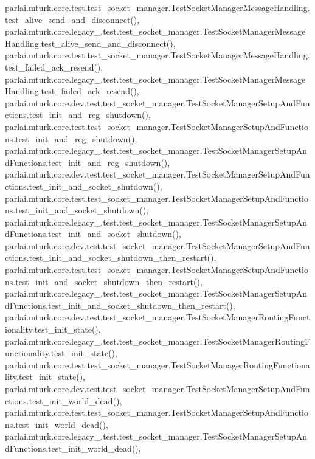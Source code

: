 parlai.\+mturk.\+core.\+test.\+test\+\_\+socket\+\_\+manager.\+Test\+Socket\+Manager\+Message\+Handling.\+test\+\_\+alive\+\_\+send\+\_\+and\+\_\+disconnect(), parlai.\+mturk.\+core.\+legacy\+\_.\+test.\+test\+\_\+socket\+\_\+manager.\+Test\+Socket\+Manager\+Message\+Handling.\+test\+\_\+alive\+\_\+send\+\_\+and\+\_\+disconnect(), parlai.\+mturk.\+core.\+test.\+test\+\_\+socket\+\_\+manager.\+Test\+Socket\+Manager\+Message\+Handling.\+test\+\_\+failed\+\_\+ack\+\_\+resend(), parlai.\+mturk.\+core.\+legacy\+\_.\+test.\+test\+\_\+socket\+\_\+manager.\+Test\+Socket\+Manager\+Message\+Handling.\+test\+\_\+failed\+\_\+ack\+\_\+resend(), parlai.\+mturk.\+core.\+dev.\+test.\+test\+\_\+socket\+\_\+manager.\+Test\+Socket\+Manager\+Setup\+And\+Functions.\+test\+\_\+init\+\_\+and\+\_\+reg\+\_\+shutdown(), parlai.\+mturk.\+core.\+test.\+test\+\_\+socket\+\_\+manager.\+Test\+Socket\+Manager\+Setup\+And\+Functions.\+test\+\_\+init\+\_\+and\+\_\+reg\+\_\+shutdown(), parlai.\+mturk.\+core.\+legacy\+\_.\+test.\+test\+\_\+socket\+\_\+manager.\+Test\+Socket\+Manager\+Setup\+And\+Functions.\+test\+\_\+init\+\_\+and\+\_\+reg\+\_\+shutdown(), parlai.\+mturk.\+core.\+dev.\+test.\+test\+\_\+socket\+\_\+manager.\+Test\+Socket\+Manager\+Setup\+And\+Functions.\+test\+\_\+init\+\_\+and\+\_\+socket\+\_\+shutdown(), parlai.\+mturk.\+core.\+test.\+test\+\_\+socket\+\_\+manager.\+Test\+Socket\+Manager\+Setup\+And\+Functions.\+test\+\_\+init\+\_\+and\+\_\+socket\+\_\+shutdown(), parlai.\+mturk.\+core.\+legacy\+\_.\+test.\+test\+\_\+socket\+\_\+manager.\+Test\+Socket\+Manager\+Setup\+And\+Functions.\+test\+\_\+init\+\_\+and\+\_\+socket\+\_\+shutdown(), parlai.\+mturk.\+core.\+dev.\+test.\+test\+\_\+socket\+\_\+manager.\+Test\+Socket\+Manager\+Setup\+And\+Functions.\+test\+\_\+init\+\_\+and\+\_\+socket\+\_\+shutdown\+\_\+then\+\_\+restart(), parlai.\+mturk.\+core.\+test.\+test\+\_\+socket\+\_\+manager.\+Test\+Socket\+Manager\+Setup\+And\+Functions.\+test\+\_\+init\+\_\+and\+\_\+socket\+\_\+shutdown\+\_\+then\+\_\+restart(), parlai.\+mturk.\+core.\+legacy\+\_.\+test.\+test\+\_\+socket\+\_\+manager.\+Test\+Socket\+Manager\+Setup\+And\+Functions.\+test\+\_\+init\+\_\+and\+\_\+socket\+\_\+shutdown\+\_\+then\+\_\+restart(), parlai.\+mturk.\+core.\+dev.\+test.\+test\+\_\+socket\+\_\+manager.\+Test\+Socket\+Manager\+Routing\+Functionality.\+test\+\_\+init\+\_\+state(), parlai.\+mturk.\+core.\+legacy\+\_.\+test.\+test\+\_\+socket\+\_\+manager.\+Test\+Socket\+Manager\+Routing\+Functionality.\+test\+\_\+init\+\_\+state(), parlai.\+mturk.\+core.\+test.\+test\+\_\+socket\+\_\+manager.\+Test\+Socket\+Manager\+Routing\+Functionality.\+test\+\_\+init\+\_\+state(), parlai.\+mturk.\+core.\+dev.\+test.\+test\+\_\+socket\+\_\+manager.\+Test\+Socket\+Manager\+Setup\+And\+Functions.\+test\+\_\+init\+\_\+world\+\_\+dead(), parlai.\+mturk.\+core.\+test.\+test\+\_\+socket\+\_\+manager.\+Test\+Socket\+Manager\+Setup\+And\+Functions.\+test\+\_\+init\+\_\+world\+\_\+dead(), parlai.\+mturk.\+core.\+legacy\+\_.\+test.\+test\+\_\+socket\+\_\+manager.\+Test\+Socket\+Manager\+Setup\+And\+Functions.\+test\+\_\+init\+\_\+world\+\_\+dead(), 